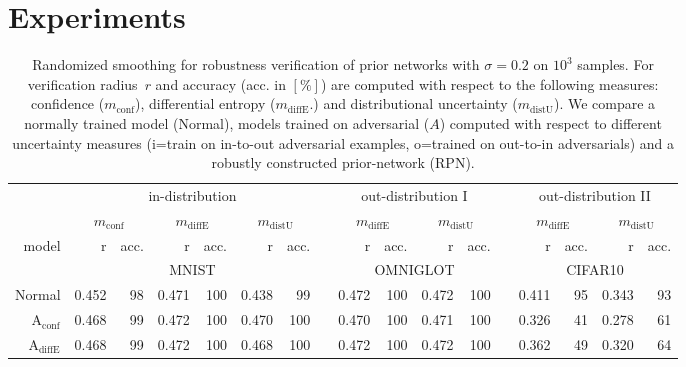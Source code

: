 
\section{Experiments}



\begin{table}[ht]
	\centering
	\caption{Randomized smoothing for robustness verification of prior networks with $\sigma=0.2$ on $10^3$ samples. For verification radius~$r$ and accuracy (acc. in $[\%]$) are computed with respect to the following measures: confidence ($m_{\mathrm{conf}}$), differential entropy ($m_{\mathrm{diffE}}$.) and distributional uncertainty ($m_{\mathrm{distU}}$). We compare a normally trained model (Normal), models trained on adversarial ($A$) computed with respect to different uncertainty measures (i=train on in-to-out adversarial examples, o=trained on out-to-in adversarials) and a robustly constructed prior-network (RPN).}
	\begin{tiny}
		\begin{tabular}{@{}rrrrrrrcrrrrcrrrr@{}}
			\toprule
			& \multicolumn{6}{c}{in-distribution} &  & \multicolumn{4}{c}{out-distribution I} &   & \multicolumn{4}{c}{out-distribution II} \\
			& \multicolumn{2}{c}{$m_{\mathrm{conf}}$}  & \multicolumn{2}{c}{$m_{\mathrm{diffE}}$} &  \multicolumn{2}{c}{$m_{\mathrm{distU}}$} &   
			& \multicolumn{2}{c}{$m_{\mathrm{diffE}}$} & \multicolumn{2}{c}{$m_{\mathrm{distU}}$} & 
			& \multicolumn{2}{c}{$m_{\mathrm{diffE}}$} & \multicolumn{2}{c}{$m_{\mathrm{distU}}$} \\
			\cmidrule{2-3}  \cmidrule{4-5} \cmidrule{6-7} \cmidrule{9-10}  \cmidrule{11-12} \cmidrule{14-15} \cmidrule{16-17}
			model & r & acc. & r & acc. & r & acc. & & r & acc. & r & acc. & & r & acc. & r & acc. \\
			\midrule
			& \multicolumn{6}{c}{MNIST} & & \multicolumn{4}{c}{OMNIGLOT} & & \multicolumn{4}{c}{CIFAR10} \\
			Normal                        & 0.452 & 98 & 0.471 & 100 & 0.438 & 99 & & 0.472 & 100 & 0.472 & 100 & & 0.411 & 95 & 0.343 & 93 \\
			$\mathrm{A}_{\mathrm{conf}}$  & 0.468 & 99 & 0.472 & 100 & 0.470 & 100 & & 0.470 & 100 & 0.471 & 100 & & 0.326 & 41 & 0.278 & 61 \\
			$\mathrm{A}_{\mathrm{diffE}}$ & 0.468 & 99 & 0.472 & 100 & 0.468 & 100 & & 0.472 & 100 & 0.472 & 100 & & 0.362 & 49 & 0.320 & 64 \\

\end{tabular}
\end{tiny}
\end{table}
